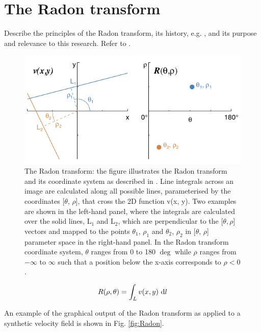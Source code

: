\section{The Radon transform}
Describe the principles of the Radon transform, its history, e.g. \citet{7910dc8d5b654c90ac4bc94c67d06f01}, and its purpose and relevance to this research. Refer to \cite{2018MNRAS.480.2217S}.

\begin{figure}
    \centering
    \includegraphics[width=\columnwidth]{images/RadonPlots/Radon-transform-Stark.png}
    \caption{The Radon transform: the figure illustrates the Radon transform and its coordinate system as described in \citet{2018MNRAS.480.2217S}. Line integrals across an image are calculated along all possible lines, parameterised by the coordinates [$\theta$, $\rho$], that cross the 2D function v(x, y). Two examples are shown in the left-hand panel, where the integrals are calculated over the solid lines, L$_1$ and L$_2$, which are perpendicular to the [$\theta, \rho$] vectors and mapped to the points $\theta_1$, $\rho_1$ and $\theta_2$, $\rho_2$ in [$\theta$, $\rho$] parameter space in the right-hand panel. In the Radon transform coordinate system, $\theta$ ranges from 0 to 180 $\deg$ while $\rho$ ranges from $-\infty$ to $\infty$  such that a position below the x-axis corresponds to $\rho < 0$.}
    \label{fig:RadonTransform}
\end{figure}


\begin{equation}
    \label{eqn:radon}
    R(\rho,\theta)=\int_{L}{v(x,y)\, \mathop{}\!\mathrm{d} l}
\end{equation}

An example of the graphical output of the Radon transform as applied to a synthetic velocity field is shown in Fig. \ref{fig:Radon}.

